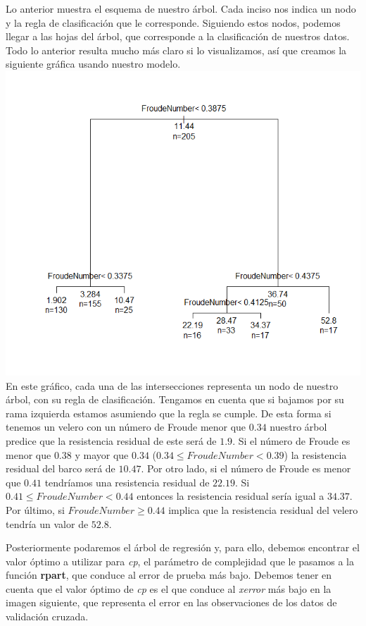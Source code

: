 \documentclass[twoside]{article}
\begin{document}
\begin{multicols}{2}
Lo anterior muestra el esquema de nuestro \'arbol. Cada inciso nos indica un nodo y la regla de clasificaci\'on que le corresponde. Siguiendo estos nodos, podemos llegar a las hojas del \'arbol, que corresponde a la clasificaci\'on de nuestros datos. Todo lo anterior resulta mucho m\'as claro si lo visualizamos, as\'i que creamos la siguiente gr\'afica usando nuestro modelo.\\

\includegraphics[scale=0.5]{images/pic_37.png}\\

En este gr\'afico, cada una de las intersecciones representa un nodo de nuestro \'arbol, con su regla de clasificaci\'on. Tengamos en cuenta que si bajamos por su rama izquierda estamos asumiendo que la regla se cumple. De esta forma si tenemos un velero con un n\'umero de Froude menor que $0.34$ nuestro \'arbol predice que la resistencia residual de este ser\'a de $1.9$. Si el n\'umero de Froude es menor que $0.38$ y mayor que $0.34$ ($0.34 \leq FroudeNumber < 0.39$) la resistencia residual del barco ser\'a de $10.47$. Por otro lado, si el n\'umero de Froude es menor que $0.41$ tendr\'iamos una resistencia residual de $22.19$. Si $0.41 \leq FroudeNumber < 0.44$ entonces la resistencia residual ser\'ia igual a $34.37$. Por \'ultimo, si $FroudeNumber \geq 0.44$ implica que la resistencia residual del velero tendr\'ia un valor de $52.8$.

Posteriormente podaremos el \'arbol de regresi\'on y, para ello, debemos encontrar el valor \'optimo a utilizar para \textit{cp}, el par\'ametro de complejidad que le pasamos a la funci\'on \textbf{rpart}, que conduce al error de prueba m\'as bajo. Debemos tener en cuenta que el valor \'optimo de \textit{cp} es el que conduce al \textit{xerror} m\'as bajo en la imagen siguiente, que representa el error en las observaciones de los datos de validaci\'on cruzada.\\


\end{multicols}
\end{document}
